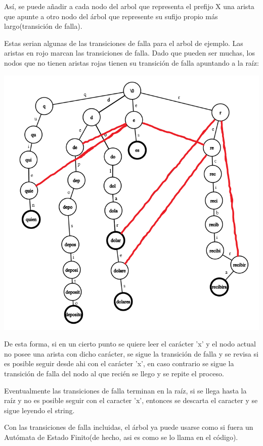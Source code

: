\documentclass{article}
\begin{document}
Así, se puede añadir a cada nodo del arbol que representa el prefijo X una arista que apunte a otro nodo del árbol que represente su 
sufijo propio más largo(transición de falla). 

Estas serian algunas de las transiciones de falla para el arbol de ejemplo. Las aristas en rojo marcan las transiciones de falla. Dado que pueden ser muchas,
los nodos que no tienen aristas rojas tienen su transición de falla apuntando a la raíz:

\includegraphics[scale=0.5]{Imagenes/trie1_transiciones_falla.png}


De esta forma, si en un cierto punto se quiere leer el carácter 'x' y el nodo actual no posee una arista con dicho carácter,
se sigue la transición de falla y se revisa si es posible seguir desde ahi con el carácter 'x', en caso contrario se sigue la transición de falla del nodo al que recién se llego y se repite el proceso.

Eventualmente las transiciones de falla terminan en la raíz, si se llega hasta la raíz y no es posible seguir con el caracter 'x', entonces se descarta el caracter y se sigue leyendo el string.

Con las transiciones de falla incluidas, el árbol ya puede usarse como si fuera un Autómata de Estado Finito(de hecho, asi es como se lo llama en el código).
\end{document}
